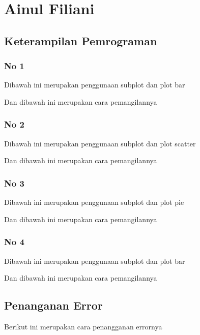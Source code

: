 \section{Ainul Filiani}
\subsection{Keterampilan Pemrograman}
\subsubsection{No 1}
\hfill \break
Dibawah ini merupakan penggunaan subplot dan plot bar

Dan dibawah ini merupakan cara pemangilannya



\subsubsection{No 2}

\hfill \break

Dibawah ini merupakan penggunaan subplot dan plot scatter

Dan dibawah ini merupakan cara pemangilannya



\subsubsection{No 3}

\hfill \break

Dibawah ini merupakan penggunaan subplot dan plot pie

Dan dibawah ini merupakan cara pemangilannya



\subsubsection{No 4}

\hfill \break

Dibawah ini merupakan penggunaan subplot dan plot bar

Dan dibawah ini merupakan cara pemangilannya



\subsection{Penanganan Error}

\hfill \break

Berikut ini merupakan cara penangganan errornya

